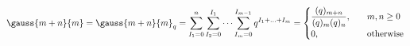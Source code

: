 \begin{equation}
\gauss{m+n}{m}=\gauss{m+n}{m}_q=
\sum_{I_1=0}^n \sum_{I_2=0}^{I_1}\cdots \sum_{I_m=0}^{I_{m-1}} q^{I_1+\ldots+I_m}
=\begin{cases}
\dfrac{(q)_{m+n}}{(q)_{m}(q)_{n}}, &\quad m,n\ge 0 \\
0, &\quad \text{otherwise}\\
\end{cases}
\end{equation}

